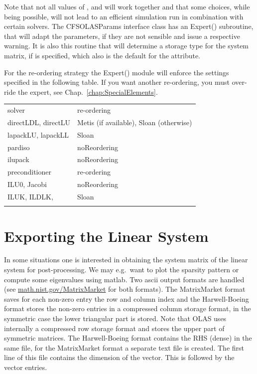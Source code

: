 %
%
Note that not all values of ,  and 
will work together and that some choices, while being possible, will not lead
to an efficient simulation run in combination with certain solvers. The
CFSOLASParams interface class has an Expert() subroutine, that will adapt the
parameters, if they are not sensible and issue a respective warning. It is also
this routine that will determine a storage type for the system matrix, if
 is specified, which also is the default for the
 attribute.

For the re-ordering strategy the Expert() module will enforce the settings
specified in the following table. If you want another re-ordering, you must
over-ride the expert, see Chap.~\ref{chap:SpecialElements}.
%
%
\begin{center}
\begin{longtable}{ll}
\hline\noalign{\smallskip}
solver              & re-ordering                             \\
\noalign{\smallskip}\hline\noalign{\smallskip}
directLDL, directLU & Metis (if available), Sloan (otherwise) \\
lapackLU, lapackLL  & Sloan                                   \\
pardiso             & noReordering                            \\
ilupack             & noReordering                            \\
\noalign{\smallskip}\hline\noalign{\smallskip}
preconditioner      & re-ordering                             \\
\noalign{\smallskip}\hline\noalign{\smallskip}
ILU0, Jacobi  & noReordering                      \\
ILUK, ILDLK,    & Sloan                              \\
\noalign{\smallskip}\hline
\end{longtable}
\end{center}
%
%
\section{Exporting the Linear System}
%
%
In some situations one is interested in obtaining the system matrix of the
linear system for post-processing. We may e.g.~want to plot the sparsity
pattern or compute some eigenvalues using matlab. Two ascii output formats are
handled (see \url{math.nist.gov/MatrixMarket} for both formats). The MatrixMarket format saves for each non-zero entry the row and column index and the Harwell-Boeing format stores the non-zero entries in a compressed column storage format, in the symmetric case the lower triangular part is stored. Note that OLAS uses internally a compressed row
storage format and stores the upper part of symmetric matrices. The
Harwell-Boeing format contains the RHS (dense) in the same file, for the
MatrixMarket format a separate text file is created. The first line of this
file contains the dimension of the vector. This is followed by the vector
entries.

